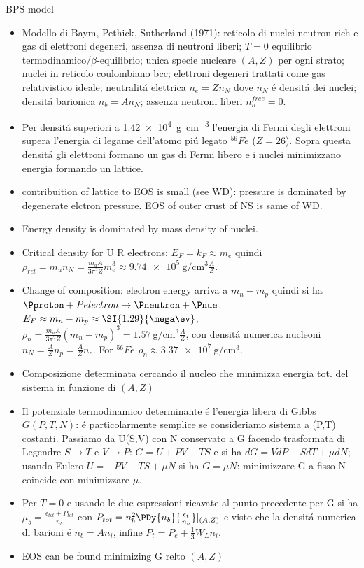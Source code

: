 \begin{frame}{BPS model} 
    \begin{itemize}
        \item Modello di Baym, Pethick, Sutherland (1971): reticolo di nuclei neutron-rich e gas di elettroni degeneri, assenza di neutroni liberi; $T=0$ equilibrio termodinamico/$\beta$-equilibrio; unica specie nucleare $(A,Z)$ per ogni strato; nuclei in reticolo coulombiano bcc; elettroni degeneri trattati come gas relativistico ideale; neutralit\'a elettrica $n_e=Zn_N$ dove $n_N$ \'e densit\'a dei nuclei; densit\'a barionica $n_b=An_N$; assenza neutroni liberi $n_n^{free}=0$.
        \item Per densit\'a superiori a \SI{1.42e4}{\gram\per\cubic\cm} l'energia di Fermi degli elettroni supera l'energia di legame dell'atomo pi\'u legato $^{56}Fe$ ($Z=26$). Sopra questa densit\'a gli elettroni formano un gas di Fermi libero e i nuclei minimizzano energia formando un lattice.
        \item contribuition of lattice to EOS  is small (see WD): pressure is dominated by degenerate elctron pressure. EOS of outer crust of NS is same of WD.
        \item Energy density is dominated by mass density of nuclei.
        \item Critical density for U R electrons: $E_F=k_F\approx m_e$ quindi $\rho_{rel}=m_un_N=\frac{m_uA}{3\pi^2Z}m_e^3\approx \SI{9.74e5}{\gram\per\cubic\cm}\frac{A}{Z}$.
        \item Change of composition: electron energy arriva a $m_n-m_p$ quindi si ha $\Pproton+Pelectron\to\Pneutron+\Pnue$. $E_F\approx m_n-m_p\approx\SI{1.29}{\mega\ev}$, $\rho_n=\frac{m_uA}{3\pi^2Z}(m_n-m_p)^3=\SI{1.57}{\gram\per\cubic\cm}\frac{A}{Z}$, con densit\'a numerica nucleoni $n_N=\frac{A}{Z}n_p=\frac{A}{Z}n_e$. For $^{56}Fe$ $\rho_n\approx\SI{3.37e7}{\gram\per\cubic\cm}$.
        \item Composizione determinata cercando il nucleo che minimizza energia tot. del sistema in funzione di $(A,Z)$
        \item Il potenziale termodinamico determinante \'e l'energia libera di Gibbs $G(P,T,N)$: \'e particolarmente semplice se consideriamo sistema a (P,T) costanti. Passiamo da U(S,V) con N conservato a G facendo trasformata di Legendre $S\to T$ e $V\to P$: $G=U+PV-TS$ e si ha $dG=VdP-SdT+\mu dN$; usando Eulero $U=-PV+TS+\mu N$ si ha $G=\mu N$: minimizzare G a fisso N coincide con minimizzare $\mu$.
        \item Per $T=0$ e usando le due espressioni ricavate al punto precedente per G si ha $\mu_b=\frac{\epsilon_{tot}+P_{tot}}{n_b}$ con $P_{tot}=n_b^2\PDy{n_b}{\frac{\epsilon_t}{n_b}}|_{(A,Z)}$ e visto che la densit\'a numerica di barioni \'e $n_b=An_i$, infine $P_t=P_e+\frac{1}{3}W_Ln_i$.
        \item EOS can be found minimizing G relto $(A,Z)$
    \end{itemize}
\end{frame}

